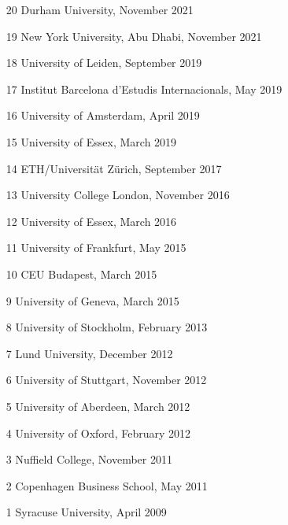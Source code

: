 \begin{enumerate}[topsep=0pt, noitemsep, leftmargin=3\labelsep]
	\item[20] Durham University, November 2021
	\item[19] New York University, Abu Dhabi, November 2021
	\item[18] University of Leiden, September 2019
	\item[17] Institut Barcelona d'Estudis Internacionals, May 2019
	\item[16] University of Amsterdam, April 2019
	\item[15] University of Essex, March 2019
	\item[14] ETH/Universität Zürich, September 2017
	\item[13] University College London, November 2016
	\item[12] University of Essex, March 2016
	\item[11] University of Frankfurt, May 2015
	\item[10] CEU Budapest, March 2015
	\item[9] University of Geneva, March 2015
	\item[8] University of Stockholm, February 2013
	\item[7] Lund University, December 2012
	\item[6] University of Stuttgart, November 2012
	\item[5] University of Aberdeen, March 2012
	\item[4] University of Oxford, February 2012
	\item[3] Nuffield College, November 2011
	\item[2] Copenhagen Business School, May 2011
	\item[1] Syracuse University, April 2009
\end{enumerate}


\clearpage
